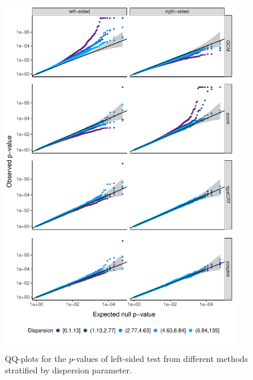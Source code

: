 \documentclass[12pt]{article}
\theoremstyle{definition}
\begin{document}
\begin{figure}[!ht]
	\centering
	\includegraphics[width=0.9\textwidth]{figures-and-tables/facet_plot_different_withglmnb_dispersion.pdf}
	\caption{QQ-plots for the $p$-values of left-sided test from different methods stratified by dispersion parameter.}
	\label{fig:qqplot_dispersion}
\end{figure}

\clearpage
\end{document}
